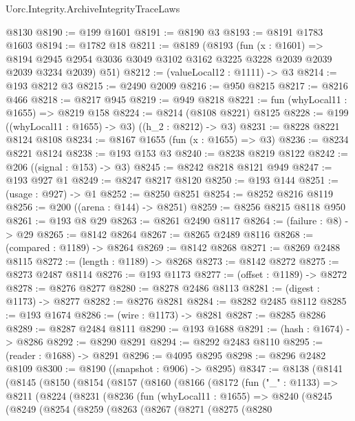 \begin{lexlean}{Uorc.Integrity.ArchiveIntegrityTraceLaws}
\begin{coremodule}
    @8130
@8190 := @199 @1601
@8191 := @8190 @3
@8193 := @8191 @1783 @1603
@8194 := @1782 @18
@8211 := @8189
    (@8193
      (fun (x : @1601) =>
      @8194 @2945 @2954 @3036 @3049 @3102 @3162 @3225 @3228 @2039 @2039 @2039 @3234 @2039)
      @51)
@8212 := (valueLocal12 : @1111) -> @3
@8214 := @193 @8212 @3
@8215 := @2490 @2009
@8216 := @950 @8215
@8217 := @8216 @466
@8218 := @8217 @945
@8219 := @949 @8218
@8221 := fun (whyLocal11 : @1655) => @8219 @158
@8224 := @8214 (@8108 @8221) @8125
@8228 := @199 ((whyLocal11 : @1655) -> @3) ((h_2 : @8212) -> @3)
@8231 := @8228 @8221 @8124 @8108
@8234 := @8167 @1655 (fun (x : @1655) => @3)
@8236 := @8234 @8221 @8124
@8238 := @193 @153 @3
@8240 := @8238 @8219 @8122
@8242 := @206 ((signal : @153) -> @3)
@8245 := @8242 @8218 @8121 @949
@8247 := @193 @927 @1
@8249 := @8247 @8217 @8120
@8250 := @193 @144
@8251 := (usage : @927) -> @1
@8252 := @8250 @8251
@8254 := @8252 @8216 @8119
@8256 := @200 ((arena : @144) -> @8251)
@8259 := @8256 @8215 @8118 @950
@8261 := @193 @8 @29
@8263 := @8261 @2490 @8117
@8264 := (failure : @8) -> @29
@8265 := @8142 @8264
@8267 := @8265 @2489 @8116
@8268 := (compared : @1189) -> @8264
@8269 := @8142 @8268
@8271 := @8269 @2488 @8115
@8272 := (length : @1189) -> @8268
@8273 := @8142 @8272
@8275 := @8273 @2487 @8114
@8276 := @193 @1173
@8277 := (offset : @1189) -> @8272
@8278 := @8276 @8277
@8280 := @8278 @2486 @8113
@8281 := (digest : @1173) -> @8277
@8282 := @8276 @8281
@8284 := @8282 @2485 @8112
@8285 := @193 @1674
@8286 := (wire : @1173) -> @8281
@8287 := @8285 @8286
@8289 := @8287 @2484 @8111
@8290 := @193 @1688
@8291 := (hash : @1674) -> @8286
@8292 := @8290 @8291
@8294 := @8292 @2483 @8110
@8295 := (reader : @1688) -> @8291
@8296 := @4095 @8295
@8298 := @8296 @2482 @8109
@8300 := @8190 ((snapshot : @906) -> @8295)
@8347 := @8138
    (@8141
      (@8145
        (@8150
          (@8154
            (@8157
              (@8160
                (@8166
                  (@8172
                    (fun ("_" : @1133) =>
                    @8211
                      (@8224
                        (@8231
                          (@8236
                            (fun (whyLocal11 : @1655) =>
                            @8240
                              (@8245
                                (@8249
                                  (@8254
                                    (@8259
                                      (@8263
                                        (@8267
                                          (@8271
                                            (@8275
                                              (@8280

\end{coremodule}
\end{lexlean}
